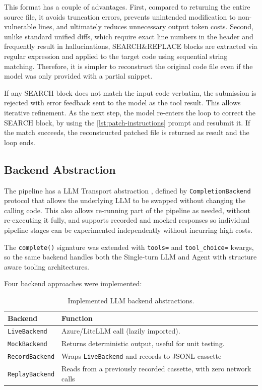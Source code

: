This format has a couple of advantages. First, compared to returning the entire source file, it avoids truncation errors, prevents unintended modification to non-vulnerable lines, and ultimately reduces unnecessary output token costs.
Second, unlike standard unified diffs, which require exact line numbers in the header and frequently result in hallucinations, SEARCH\&REPLACE blocks are extracted via regular expression and applied to the target code using sequential string matching. Therefore, it is simpler to reconstruct the original code file even if the model was only provided with a partial snippet.

If any SEARCH block does not match the input code verbatim, the submission is rejected with error feedback sent to the model as the tool result. 
This allows iterative refinement.
As the next step, the model re-enters the loop to correct the SEARCH block, by using the \ref{lst:patch-instructions} prompt and resubmit it.
If the match succeeds, the reconstructed patched file is returned as result and the loop ends.


\subsection{Backend Abstraction}
The pipeline has a LLM Transport abstraction
, defined by \texttt{CompletionBackend} protocol that allows the underlying LLM to be swapped without changing the calling code.
This also allows re-running part of the pipeline as needed, without re-executing it fully, and supports recorded and mocked responses so individual pipeline stages can be experimented independently without incurring high costs.

The \texttt{complete()} signature was extended with \texttt{tools=} and \texttt{tool\_choice=} kwargs, so the same backend handles both the Single-turn LLM and Agent with structure aware tooling architectures. 

Four backend approaches were implemented:

\begin{table}[ht]
 \caption[Implemented LLM backend abstractions]{Implemented LLM backend abstractions.}\label{tab:backend_call}

\centering
\begin{tabularx}{\textwidth}{l X}
  \toprule
  \textbf{Backend} & \textbf{Function} \\
  \midrule
  \texttt{LiveBackend} & Azure/LiteLLM call (lazily imported). \\
  \addlinespace
  \texttt{MockBackend} & Returns deterministic output, useful for unit testing. \\
  \addlinespace
  \texttt{RecordBackend} & Wraps \texttt{LiveBackend} and records to JSONL cassette \\
  \addlinespace
  \texttt{ReplayBackend} & Reads from a previously recorded cassette, with zero network calls  \\
\end{tabularx} 
\end{table}

